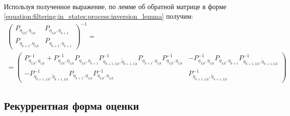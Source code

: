 Используя полученное выражение, по лемме об обратной матрице в форме \eqref{equation:filtering:in_states:process:inversion_lemma} получим:
\begin{multline} \label{equation:filtering:in_states:process:observations_inverse_covariance}
	\begin{pmatrix}
		P_{\eta_{1|k}, \eta_{1|k}} & P_{\eta_{1|k}, \eta_{k+1}} \\
		P_{\eta_{k+1}, \eta_{1|k}} & P_{\eta_{k+1}, \eta_{k+1}}
	\end{pmatrix}^{-1} = \\
	=
	\begin{pmatrix}
		P_{\eta_{1|k},\eta_{1|k}}^{-1} + P_{\eta_{1|k},\eta_{1|k}}^{-1} P_{\eta_{1|k}, \eta_{k+1}} P_{\widetilde{\eta}_{k+1, 1|k}, \widetilde{\eta}_{k+1, 1|k}}^{-1} P_{\eta_{k+1}, \eta_{1|k}} P_{\eta_{1|k},\eta_{1|k}}^{-1} & - P_{\eta_{1|k},\eta_{1|k}}^{-1} P_{\eta_{1|k}, \eta_{k+1}} P_{\widetilde{\eta}_{k+1, 1|k}, \widetilde{\eta}_{k+1, 1|k}}^{-1} \\
		- P_{\widetilde{\eta}_{k+1, 1|k}, \widetilde{\eta}_{k+1, 1|k}}^{-1} P_{\eta_{k+1}, \eta_{1|k}} P_{\eta_{1|k},\eta_{1|k}}^{-1}                                                                                          & P_{\widetilde{\eta}_{k+1, 1|k}, \widetilde{\eta}_{k+1, 1|k}}^{-1}
	\end{pmatrix}
\end{multline}

\subsection{Рекуррентная форма оценки}

